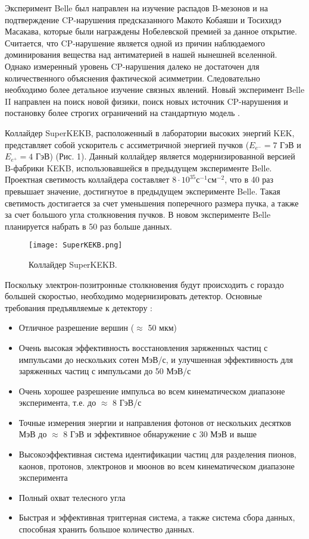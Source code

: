   Эксперимент Belle был направлен на изучение распадов B-мезонов и на подтверждение CP-нарушения предсказанного Макото Кобаяши и Тосихидэ Масакава, которые были награждены Нобелевской премией за данное открытие. Считается, что CP-нарушение является одной из причин наблюдаемого доминирования вещества над антиматерией в нашей нынешней вселенной. Однако измеренный уровень CP-нарушения далеко не достаточен для количественного объяснения фактической асимметрии. Следовательно необходимо более детальное изучение связных явлений. Новый эксперимент Belle II направлен на поиск новой физики, поиск новых источник CP-нарушения и постановку более строгих ограничений на стандартную модель \cite{BelleIIExp}.\par 
Коллайдер SuperKEKB, расположенный в лаборатории высоких энергий KEK, представляет собой ускоритель с ассиметричной энергией пучков ($E_{e^-}=7$ ГэВ и $E_{e^+}=4$ ГэВ) (Рис. 1). Данный коллайдер является модернизированной версией B-фабрики KEKB, использовавшейся в предыдущем эксперименте Belle. Проектная светимость коллайдера составляет $8\cdot10^{35}$с$^{-1}$см$^{-2}$, что в 40 раз превышает значение, достигнутое в предыдущем эксперименте Belle. Такая светимость достигается за счет уменьшения поперечного размера пучка, а также за счет большого угла столкновения пучков. В новом эксперименте Belle планируется набрать в 50 раз больше данных.\par
\begin{figure}[htp]
    \centering
    \texttt{[image: SuperKEKB.png]}
    \caption{Коллайдер SuperKEKB.}
    \label{fig:galaxy}
\end{figure}
  Поскольку электрон-позитронные столкновения будут происходить с гораздо большей скоростью, необходимо модернизировать детектор. Основные требования предъявляемые к детектору \cite{PhBook}: 
\begin{itemize}
  \item Отличное разрешение вершин ($\approx$ 50 мкм)
  \item Очень высокая эффективность восстановления заряженных частиц с импульсами до нескольких сотен МэВ/с, и улучшенная эффективность для заряженных частиц с импульсами до 50 МэВ/с
  \item Очень хорошее разрешение импульса во всем кинематическом диапазоне эксперимента, т.е. до $\approx$ 8 ГэВ/с
  \item Точные измерения энергии и направления фотонов от нескольких десятков МэВ до $\approx$ 8 ГэВ и эффективное обнаружение с 30 МэВ и выше
  \item Высокоэффективная система идентификации частиц для разделения пионов, каонов, протонов, электронов и мюонов во всем кинематическом диапазоне эксперимента
  \item Полный охват телесного угла
  \item Быстрая и эффективная триггерная система, а также система сбора данных, способная хранить большое количество данных.
\end{itemize} \par
